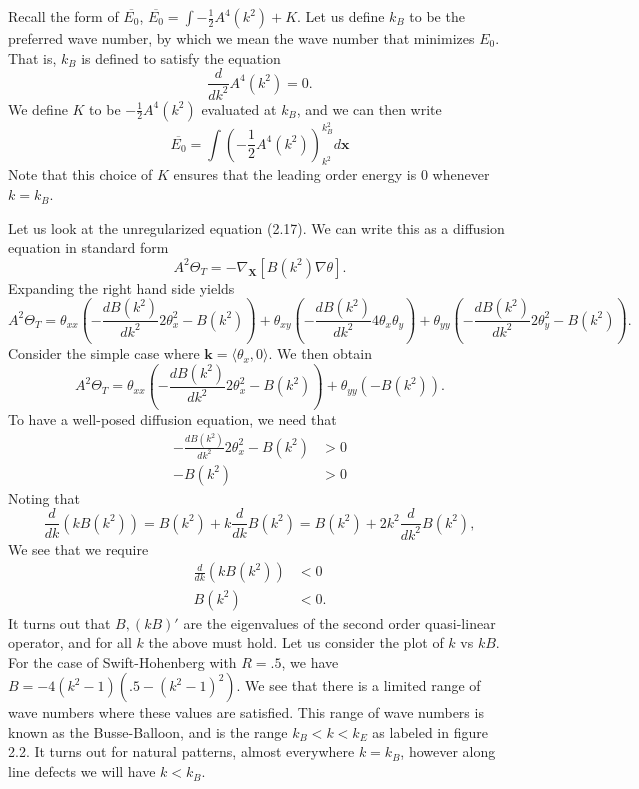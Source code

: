 \documentclass[12pt]{article}
\numberwithin{equation}{section}
\begin{document}
Recall the form of $\overline{E_0}$, $\overline{E_0} = \int -\frac{1}{2}A^4(k^2)+K$.
Let us define $k_B$ to be the preferred wave number, by which we mean the wave number that minimizes $E_0$.
That is, $k_B$ is defined to satisfy the equation
\begin{equation}
\frac{d}{dk^2}A^4(k^2) = 0.
\end{equation}
We define $K$ to be $-\frac{1}{2}A^4(k^2)$ evaluated at $k_B$, and we can then write
\begin{equation}
\overline{E_0} = \int \left( -\frac{1}{2}A^4(k^2)\right)_{k^2}^{k_B^2}d\bm{x}
\end{equation}
Note that this choice of $K$ ensures that the leading order energy is $0$ whenever $k = k_B$.
\par Let us look at the unregularized equation (2.17). We can write this as a diffusion equation in standard form
\begin{equation}
A^2\Theta_T = -\nabla_{\bm{X}}\left[ B(k^2)\nabla \theta\right].
\end{equation}
Expanding the right hand side yields
\begin{equation}
A^2\Theta_T = \theta_{xx}\left(-\frac{dB(k^2)}{dk^2}2\theta_x^2 - B(k^2)\right) + \theta_{xy}\left(-\frac{dB(k^2)}{dk^2}4\theta_x\theta_y\right) + \theta_{yy}\left(-\frac{dB(k^2)}{dk^2}2\theta_y^2 -B(k^2)\right).
\end{equation}
Consider the simple case where $\bm{k} = \langle \theta_x, 0\rangle$.
We then obtain
\begin{equation*}
A^2\Theta_T = \theta_{xx}\left(-\frac{dB(k^2)}{dk^2}2\theta_x^2 - B(k^2)\right) + \theta_{yy}\left(-B(k^2)\right).
\end{equation*}
To have a well-posed diffusion equation, we need that
\begin{align}
-\frac{dB(k^2)}{dk^2}2\theta_x^2 - B(k^2) &>0\\
-B(k^2) &>0
\end{align}
Noting that
\begin{equation}
\frac{d}{dk}\left(kB(k^2)\right) = B(k^2)+k\frac{d}{dk}B(k^2) = B(k^2)+2k^2\frac{d}{dk^2}B(k^2),
\end{equation}
We see that we require
\begin{align}
\frac{d}{dk}(kB(k^2)) &<0\\
B(k^2) &< 0.
\end{align}
It turns out that $B, (kB)'$ are the eigenvalues of the second order quasi-linear operator, and for all $k$ the above must hold. Let us consider the plot of $k$ vs $kB$. For the case of Swift-Hohenberg with $R=.5$, we have $B = -4(k^2-1)(.5-(k^2-1)^2)$. We see that there is a limited range of wave numbers where these values are satisfied. This range of wave numbers is known as the Busse-Balloon, and is the range $k_B<k<k_E$ as labeled in figure 2.2. It turns out for natural patterns, almost everywhere $k=k_B$, however along line defects we will have $k<k_B$.
\end{document}

